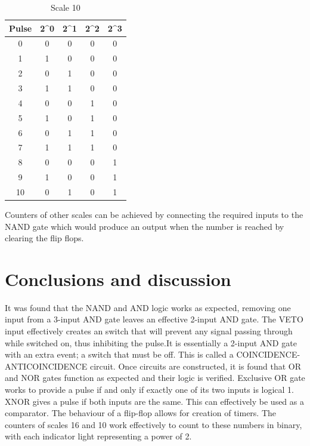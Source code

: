 \documentclass{article}
\begin{document}
\begin{table}[h!]
    \centering
    \begin{tabular}{c|c c c c}
         Pulse & 2^0 & 2^1 & 2^2 & 2^3 \\
         \hline
         0& 0& 0& 0& 0\\
         1& 1& 0& 0& 0\\
         2& 0& 1& 0& 0\\
         3& 1& 1& 0& 0\\
         4& 0& 0& 1& 0\\
         5& 1& 0& 1& 0\\
         6& 0& 1& 1& 0\\
         7& 1& 1& 1& 0\\
         8& 0& 0& 0& 1\\
         9& 1& 0& 0& 1\\
         10& 0& 1& 0& 1\\
    \end{tabular}
    \caption{Scale 10}
    \label{tab:9}
\end{table}

Counters of other scales can be achieved by connecting the required inputs to the NAND gate which would produce an output when the number is reached by clearing the flip flops.

\section{Conclusions and discussion}

It was found that the NAND and AND logic works as expected, removing one input from a 3-input AND gate leaves an effective 2-input AND gate.
The VETO input effectively creates an switch that will prevent any signal passing through while switched on, thus inhibiting the pulse.It is essentially a 2-input AND gate with an extra event; a switch that must be off. This is called a COINCIDENCE-ANTICOINCIDENCE circuit.
\vspace{3mm}
Once circuits are constructed, it is found that OR and NOR gates function as expected and their logic is verified.
\vspace{3mm}
Exclusive OR gate works to provide a pulse if and only if exactly one of its two inputs is logical 1. XNOR gives a pulse if both inputs are the same. This can effectively be used as a comparator.
\vspace{3mm}
The behaviour of a flip-flop allows for creation of timers.
\vspace{3mm}
The counters of scales 16 and 10 work effectively to count to these numbers in binary, with each indicator light representing a power of 2.
\end{document}
